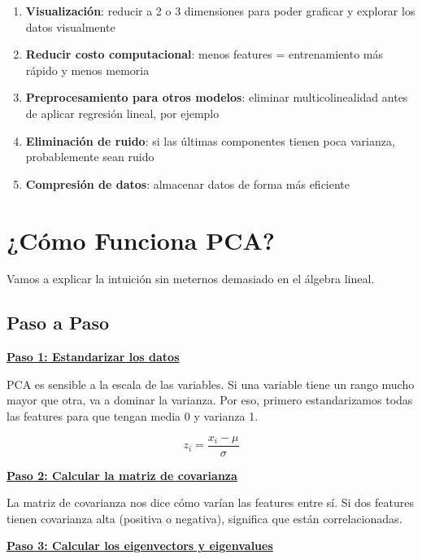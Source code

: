 \documentclass[12pt]{article}
\begin{document}
\begin{enumerate}
    \item \textbf{Visualización}: reducir a 2 o 3 dimensiones para poder graficar y explorar los datos visualmente
    \item \textbf{Reducir costo computacional}: menos features = entrenamiento más rápido y menos memoria
    \item \textbf{Preprocesamiento para otros modelos}: eliminar multicolinealidad antes de aplicar regresión lineal, por ejemplo
    \item \textbf{Eliminación de ruido}: si las últimas componentes tienen poca varianza, probablemente sean ruido
    \item \textbf{Compresión de datos}: almacenar datos de forma más eficiente
\end{enumerate}

\section{¿Cómo Funciona PCA?}

Vamos a explicar la intuición sin meternos demasiado en el álgebra lineal.

\subsection{Paso a Paso}

\textbf{\underline{Paso 1: Estandarizar los datos}}

\vspace{0.5em}

PCA es sensible a la escala de las variables. Si una variable tiene un rango mucho mayor que otra, va a dominar la varianza. Por eso, primero estandarizamos todas las features para que tengan media 0 y varianza 1.

\[
z_i = \frac{x_i - \mu}{\sigma}
\]

\textbf{\underline{Paso 2: Calcular la matriz de covarianza}}

\vspace{0.5em}

La matriz de covarianza nos dice cómo varían las features entre sí. Si dos features tienen covarianza alta (positiva o negativa), significa que están correlacionadas.

\vspace{0.5em}

\textbf{\underline{Paso 3: Calcular los eigenvectors y eigenvalues}}
\end{document}
